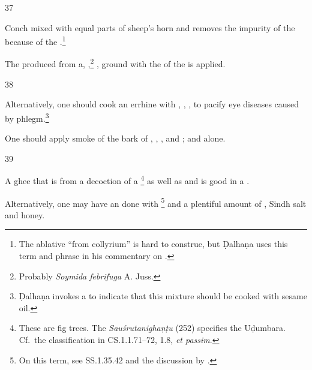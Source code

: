 \begin{translation}
    \item [37]
    
    Conch mixed with equal parts of sheep's horn and  removes the
    impurity of the  because of the .\footnote{The ablative “from collyrium” is hard to construe, but 
    Ḍalhaṇa uses this term and phrase in his commentary on .}
    
    
    
    The  produced from 
    a,
    ,\footnote{Probably \emph{Soymida febrifuga} A. Juss.}
    ,
    ground with the  of the  is 
    applied. 
    
    \item[38]
    
    Alternatively, one should cook an errhine with 
    ,
    ,
    ,
     to pacify eye diseases caused by 
    phlegm.\footnote{Ḍalhaṇa invokes a  to indicate that 
    this mixture should be cooked with sesame oil. }
    
    
    
    One should apply smoke of the bark of
    ,
    ,
    ,
    and
    ; and
     alone.
    
    \item[39] 
    
    A ghee that is  from a decoction of a
    \footnote{These are fig trees.  The 
    \emph{Sauśrutanighaṇṭu} (252) specifies the Uḍumbara. Cf.\ the classification in
    CS.1.1.71--72, 1.8, \emph{et passim}.}
    as well as 
    and 
    is good in a 
    . 
    
    
    
    Alternatively, one may have an  done with
    \footnote{On this term, see SS.1.35.42 
    \citep[157]{vulgate} and the discussion by
    \citet[25--31]{zimm-1999}.} 
    and a plentiful amount of , Sindh salt and honey.
    

\end{translation}
